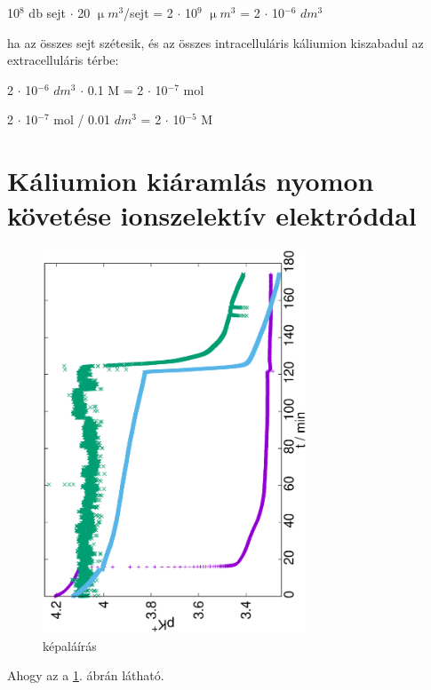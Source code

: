 10$^8$ db sejt $\cdot$ 20 $\upmu m^3$/sejt = 2 $\cdot$ 10$^9$ $\upmu m^3$ = 2 $\cdot$ 10$^{-6}$ $dm^3$

ha az összes sejt szétesik, és az összes intracelluláris káliumion kiszabadul az extracelluláris térbe:

2 $\cdot$ 10$^{-6}$ $dm^3$ $\cdot$ 0.1 M = 2 $\cdot$ 10$^{-7}$ mol

2 $\cdot$ 10$^{-7}$ mol / 0.01 $dm^3$ = 2 $\cdot$ 10$^{-5}$ M


\section{Káliumion kiáramlás nyomon követése ionszelektív elektróddal}

\begin{figure}
\centering
\includegraphics[width=0.7\textwidth, angle=-90]{img/meres.eps}
\caption{képaláírás}
\label{fig:mérések}
\end{figure}

Ahogy az a \ref{fig:mérések}. ábrán látható.


